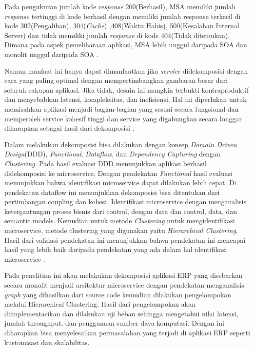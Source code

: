 Pada pengukuran jumlah kode \textit{response} 200(Berhasil), MSA memiliki jumlah \textit{response} tertinggi di kode berhasil dengan memiliki jumlah response terkecil di kode 302(Pengalihan), 304(\textit{Cache}) ,408(Waktu Habis), 500(Kesalahan Internal Server) dan tidak memiliki jumlah \textit{response} di kode 404(Tidak ditemukan). Dimana pada aspek pemeliharaan aplikasi, MSA lebih unggul daripada SOA dan monolit unggul daripada SOA \cite{4}.

Naman manfaat ini hanya dapat dimanfaatkan jika \textit{service} didekomposisi dengan cara yang paling optimal dengan mempertimbangkan gambaran besar dari seluruh cakupan aplikasi. Jika tidak, desain ini mungkin terbukti kontraproduktif dan menyebabkan latensi, kompleksitas, dan inefisiensi. Hal ini diperlukan untuk memisahkan aplikasi menjadi bagian-bagian yang sesuai secara fungsional dan memperoleh service kohesif tinggi dan service yang digabungkan secara longgar diharapkan sebagai hasil dari dekomposisi \cite{3}.

Dalam melakukan dekomposisi bisa dilakukan dengan konsep \textit{Domain Driven Design}(DDD), \textit{Functional}, \textit{Dataflow}, dan \textit{Dependency Capturing} dengan \textit{Clustering}. Pada hasil evaluasi DDD menunjukkan aplikasi berhasil didekomposisi ke microservice. Dengan pendekatan \textit{Functional} hasil evaluasi menunjukkan bahwa identifikasi microservice dapat dilakukan lebih cepat. Di pendekatan dataflow ini menunjukkan dekomposisi bisa ditentukan dari pertimbangan coupling dan kohesi. Identifikasi microservice dengan menganalisis ketergantungan proses bisnis dari control, dengan data dan control, data, dan semantic models. Kemudian untuk metode \textit{Clustering} untuk mengidentifikasi microservice, metode clustering yang digunakan yaitu \textit{Hierarchical Clustering}. Hasil dari validasi pendekatan ini menunjukkan bahwa pendekatan ini mencapai hasil yang lebih baik daripada pendekatan yang ada dalam hal identifikasi microservice \cite{5}.

Pada penelitian ini akan melakukan dekomposisi aplikasi ERP yang disebarkan secara monolit menjadi arsitektur microservice dengan pendekatan menganalisis \textit{graph} yang dihasilkan dari source code kemudian dilakukan pengelompokan melalui Hierarchical Clustering. Hasil dari pengelompokan akan diimplementasikan dan dilakukan uji beban sehingga mengetahui nilai latensi, jumlah throughput, dan penggunaan sumber daya komputasi. Dengan ini diharapkan bisa menyelesaikan permasalahan yang terjadi di aplikasi ERP seperti kustomisasi dan skalabilitas.\\

